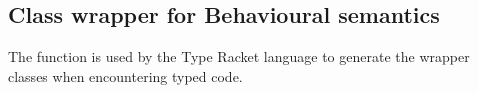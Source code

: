 \documentclass[a4paper,USenglish]{tex/lipics-v2016}
\begin{document}
\begin{mathpar}


\end{mathpar}



\subsection{Class wrapper for Behavioural semantics}\label{wrap}

The  function is used by the Type Racket language to generate the wrapper classes
when encountering typed code.
\end{document}
